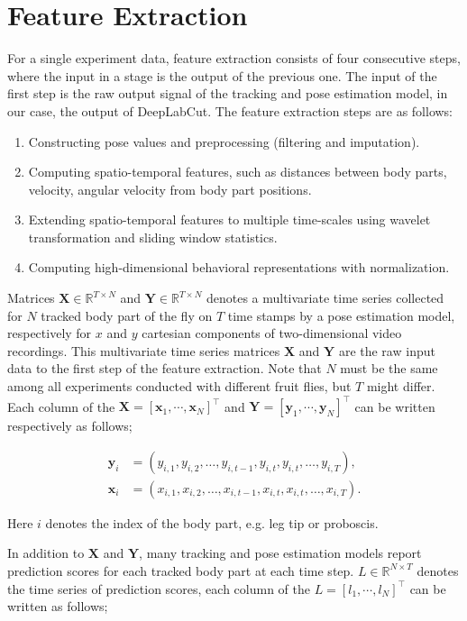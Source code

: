 \chapter{Feature Extraction}
For a single experiment data, feature extraction consists of four consecutive steps, where the input in a stage is the output of the previous one.
The input of the first step is the raw output signal of the tracking and pose estimation model, in our case, the output of DeepLabCut.
The feature extraction steps are as follows:

\begin{enumerate}
	\item Constructing pose values and preprocessing (filtering and imputation).
	\item Computing spatio-temporal features, such as distances between body parts, velocity, angular velocity from body part positions.
	\item Extending spatio-temporal features to multiple time-scales using wavelet transformation and sliding window statistics.
	\item Computing high-dimensional behavioral representations with normalization.
\end{enumerate}

Matrices $\mathbf{X} \in \mathbb{R}^{T \times N}$ and $\mathbf{Y} \in \mathbb{R}^{T \times N}$ denotes a multivariate time series collected for $N$ tracked body part of the fly on $T$ time stamps by a pose estimation model, respectively for $x$ and $y$ cartesian components of two-dimensional video recordings. This multivariate time series matrices $\mathbf{X}$ and $\mathbf{Y}$ are the raw input data to the first step of the feature extraction.
Note that $N$ must be the same among all experiments conducted with different fruit flies, but $T$ might differ.
Each column of the $\mathbf{X}=[\mathbf{x}_1, \cdots, \mathbf{x}_N]^\top$ and $\mathbf{Y}=[\mathbf{y}_1, \cdots, \mathbf{y}_N]^\top$ can be written respectively as follows;

\begin{align*}
	\mathbf{y}_i & = (y_{i,1}, y_{i,2}, \dots, y_{i,t-1}, y_{i,t}, y_{i,t}, \dots, y_{i,T}), \\
	\mathbf{x}_i & = (x_{i,1}, x_{i,2}, \dots, x_{i,t-1}, x_{i,t}, x_{i,t}, \dots, x_{i,T}).
\end{align*}

Here $i$ denotes the index of the body part, e.g. leg tip or proboscis.


In addition to $\mathbf{X}$ and $\mathbf{Y}$, many tracking and pose estimation models report prediction scores for each tracked body part at each time step.
$L \in \mathbb{R}^{N \times T}$ denotes the time series of prediction scores, each column of the $L=[l_1, \cdots, l_N]^\top$ can be written as follows;

